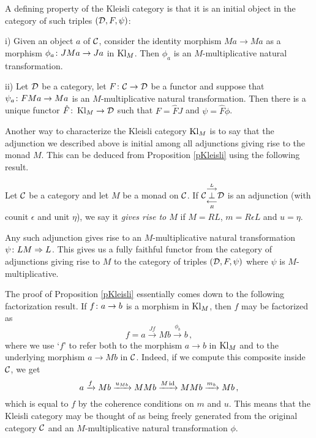A defining property of the Kleisli category is that it is an initial object in the category of such triples $(\D,F,\psi)$:

\begin{proposition}
  i) Given an object $a$ of $\C$, consider the identity morphism $Ma \to Ma$ as a morphism $\phi_a \from JMa \to Ja$ in $\Kl_M$.  
  Then $\phi_a$ is an $M$-multiplicative natural transformation.

  ii) Let $\D$ be a category, let $F\from \C \to \D$ be a functor and suppose that $\psi_a\from FMa \to Ma$ is an $M$-multiplicative natural transformation.
  Then there is a unique functor $\hat{F}\from \Kl_M \to \D$ such that $F=\hat{F}J$ and $\psi = \hat{F}\phi$.
  \label{pKleisli}
\end{proposition}

Another way to characterize the Kleisli category $\Kl_M$ is to say that the adjunction we described above is initial among all adjunctions giving rise to the monad $M$.  
This can be deduced from Proposition \ref{pKleisli} using the following result.

\begin{lemma}
  Let $\C$ be a category and let $M$ be a monad on $\C$.  
  If $\adjunction{\C}{L}{R}{\D}$ is an adjunction (with counit $\epsilon$ and unit $\eta$), we say it \emph{gives rise to $M$} if $M=RL$, $m=R\epsilon L$ and $u=\eta$.

  Any such adjunction gives rise to an $M$-multiplicative natural transformation $\psi\from LM \Rightarrow L$.  
  This gives us a fully faithful functor from the category of adjunctions giving rise to $M$ to the category of triples $(\D,F,\psi)$ where $\psi$ is $M$-multiplicative.
\end{lemma}

The proof of Proposition \ref{pKleisli} essentially comes down to the following factorization result.  
If $f\from a \to b$ is a morphism in $\Kl_M$, then $f$ may be factorized as
\[
  f = a \xrightarrow{Jf}
  Mb \xrightarrow{\phi_b}
  b\,,
  \]
where we use `$f$' to refer both to the morphism $a\to b$ in $\Kl_M$ and to the underlying morphism $a \to Mb$ in $\C$.
Indeed, if we compute this composite inside $\C$, we get
\[
  a \xrightarrow{f}
  Mb \xrightarrow{u_{Mb}}
  MMb \xrightarrow{M\id}
  MMb \xrightarrow{m_b}
  Mb\,,
  \]
which is equal to $f$ by the coherence conditions on $m$ and $u$.
This means that the Kleisli category may be thought of as being freely generated from the original category $\C$ and an $M$-multiplicative natural transformation $\phi$.

